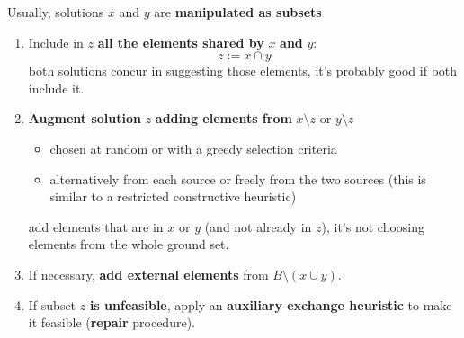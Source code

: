 \documentclass[11pt]{article}
\begin{document}
	Usually, solutions $x$ and $y$ are \textbf{manipulated as subsets}
	\begin{enumerate}
		\item Include in $z$ \textbf{all the elements shared by} $x$ \textbf{and} $y$:
		$$ z := x \cap y $$
		both solutions concur in suggesting those elements, it's probably good if both include it.\\
		
		\item \textbf{Augment solution} $z$ \textbf{adding elements from} $x \setminus z$ or $y \setminus z$
		\begin{itemize}
			\item chosen at random or with a greedy selection criteria
			\item alternatively from each source or freely from the two sources (this is similar to a restricted constructive heuristic)
		\end{itemize}
		add elements that are in $x$ or $y$ (and not already in $z$), it's not choosing elements from the whole ground set.\\
		
		\item If necessary, \textbf{add external elements} from $B \setminus (x \cup y)$.\\
		
		\item If subset $z$ \textbf{is unfeasible}, apply an \textbf{auxiliary exchange heuristic} to make it feasible (\textbf{repair} procedure).\\
	\end{enumerate}
	
	\newpage
	
\end{document}
